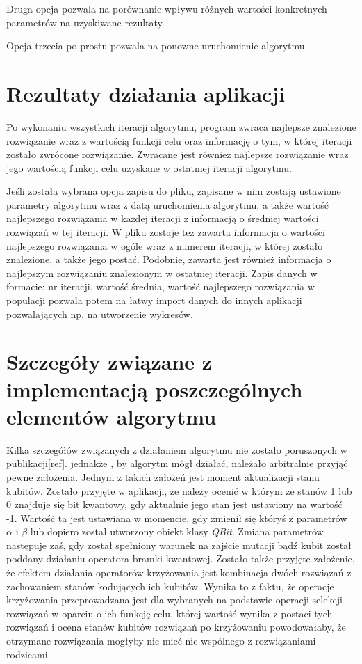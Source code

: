 Druga opcja pozwala na porównanie wpływu różnych wartości konkretnych parametrów na uzyskiwane rezultaty.

Opcja trzecia po prostu pozwala na ponowne uruchomienie algorytmu.

\section{Rezultaty działania aplikacji}
Po wykonaniu wszystkich iteracji algorytmu, program zwraca najlepsze znalezione rozwiązanie wraz z wartością funkcji celu oraz informację o tym, w której iteracji zostało zwrócone rozwiązanie. Zwracane jest również najlepsze rozwiązanie wraz jego wartością funkcji celu uzyskane w ostatniej iteracji algorytmu.

Jeśli została wybrana opcja zapisu do pliku, zapisane w nim zostają ustawione parametry algorytmu wraz z datą uruchomienia algorytmu, a także wartość najlepszego rozwiązania w każdej iteracji z informacją o średniej wartości rozwiązań w tej iteracji. W pliku zostaje też zawarta informacja o wartości najlepszego rozwiązania w ogóle wraz z numerem iteracji, w której zostało znalezione, a także jego postać. Podobnie, zawarta jest również informacja o najlepszym rozwiązaniu znalezionym w ostatniej iteracji. Zapis danych w formacie: nr iteracji, wartość średnia, wartość najlepszego rozwiązania w populacji pozwala potem na łatwy import danych do innych aplikacji pozwalających np. na utworzenie wykresów.

\section{Szczegóły związane z implementacją poszczególnych elementów algorytmu}
Kilka szczegółów związanych z działaniem algorytmu nie zostało poruszonych w publikacji[ref]. jednakże , by algorytm mógł działać, należało arbitralnie przyjąć pewne założenia. Jednym z takich założeń jest moment aktualizacji stanu kubitów. Zostało przyjęte w aplikacji, że należy ocenić w którym ze stanów 1 lub 0 znajduje się bit kwantowy, gdy aktualnie jego stan jest ustawiony na wartość -1. Wartość ta jest ustawiana w momencie, gdy zmienił się któryś z parametrów $\alpha$ i $\beta$ lub dopiero został utworzony obiekt klasy \textit{QBit}. Zmiana parametrów następuje zaś, gdy został spełniony warunek na zajście mutacji bądź kubit został poddany działaniu operatora bramki kwantowej. Zostało także przyjęte założenie, że efektem działania operatorów krzyżowania jest kombinacja dwóch rozwiązań z zachowaniem stanów kodujących ich kubitów. Wynika to z faktu, że operacje krzyżowania przeprowadzana jest dla wybranych na podstawie operacji selekcji rozwiązań w oparciu o ich funkcję celu, której wartość wynika z postaci tych rozwiązań i ocena stanów kubitów rozwiązań po krzyżowaniu powodowałaby, że otrzymane rozwiązania mogłyby nie mieć nic wspólnego z rozwiązaniami rodzicami.

